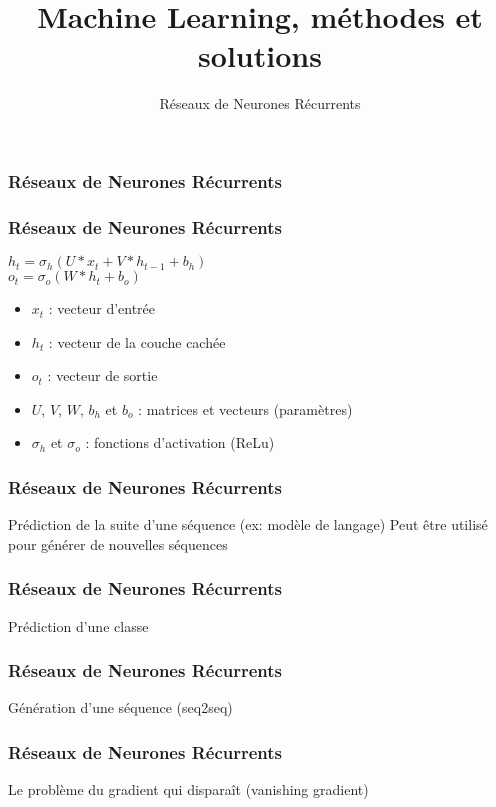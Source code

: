 \documentclass{formation}
\title{Machine Learning, méthodes et solutions}
\subtitle{Réseaux de Neurones Récurrents}
\begin{document}
\maketitle

\begin{frame}
  \frametitle{Réseaux de Neurones Récurrents}
\end{frame}

\begin{frame}
  \frametitle{Réseaux de Neurones Récurrents}
  $h_{t}=\sigma_{h}(U*x_{t}+V*h_{t-1}+b_{h})$ \\
  $o_{t}=\sigma_{o}(W*h_{t}+b_{o})$ \\
  \begin{itemize}
  \item $x_{t}$ : vecteur d'entrée
  \item $h_t$ : vecteur de la couche cachée
  \item $o_{t}$ : vecteur de sortie
  \item $U$, $V$, $W$, $b_h$ et $b_o$ : matrices et vecteurs (paramètres)
  \item $\sigma_{h}$ et $\sigma_o$ : fonctions d'activation (ReLu)
  \end{itemize}
\end{frame}

\begin{frame}
  \frametitle{Réseaux de Neurones Récurrents}
  Prédiction de la suite d'une séquence (ex: modèle de langage)
  Peut être utilisé pour générer de nouvelles séquences
\end{frame}

\begin{frame}
  \frametitle{Réseaux de Neurones Récurrents}
  Prédiction d'une classe
\end{frame}

\begin{frame}
  \frametitle{Réseaux de Neurones Récurrents}
  Génération d'une séquence (seq2seq)
\end{frame}

\begin{frame}
  \frametitle{Réseaux de Neurones Récurrents}
  Le problème du gradient qui disparaît (vanishing gradient)
\end{frame}
\end{document}
